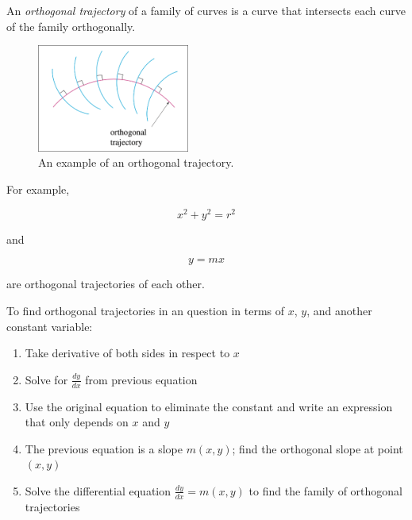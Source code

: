 An \textit{orthogonal trajectory} of a family of curves is a curve that intersects each curve of the family orthogonally.

\begin{figure}[H]
    \centering
    \includegraphics[width=50mm]{content/diffeq/images/orthogonal_0.png}
    \caption{An example of an orthogonal trajectory.}
\end{figure}

For example,

\[
    x^2 + y^2 = r^2
\]

and

\[
    y = mx
\]

are orthogonal trajectories of each other.

To find orthogonal trajectories in an question in terms of $x$, $y$, and another constant variable:

\begin{enumerate}
    \item Take derivative of both sides in respect to $x$
    \item Solve for $\frac{dy}{dx}$ from previous equation
    \item Use the original equation to eliminate the constant and write an expression that only depends on $x$ and $y$
    \item The previous equation is a slope $m(x,y)$; find the orthogonal slope at point $(x,y)$
    \item Solve the differential equation $\frac{dy}{dx} = m(x,y)$ to find the family of orthogonal trajectories
\end{enumerate}